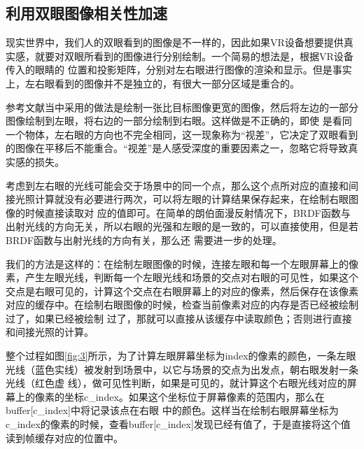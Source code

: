 \documentclass[UTF8]{ctexart}
\begin{document}
    \subsection{利用双眼图像相关性加速}
        现实世界中，我们人的双眼看到的图像是不一样的，因此如果VR设备想要提供真实感，就要对双眼所看到的图像进行分别绘制。一个简易的想法是，根据VR设备传入的眼睛的
        位置和投影矩阵，分别对左右眼进行图像的渲染和显示。但是事实上，左右眼看到的图像并不是独立的，有很大一部分区域是重合的。
        
        参考文献\cite{fujita2014foveated}当中采用的做法是绘制一张比目标图像更宽的图像，然后将左边的一部分图像绘制到左眼，将右边的一部分绘制到右眼。这样做是不正确的，即使
        是看同一个物体，左右眼的方向也不完全相同，这一现象称为“视差”，它决定了双眼看到的图像在平移后不能重合。“视差”是人感受深度的重要因素之一，忽略它将导致真实感的损失。
        
        考虑到左右眼的光线可能会交于场景中的同一个点，那么这个点所对应的直接和间接光照计算就没有必要进行两次，可以将左眼的计算结果保存起来，在绘制右眼图像的时候直接读取对
        应的值即可。在简单的朗伯面漫反射情况下，BRDF函数与出射光线的方向无关，所以右眼的光强和左眼的是一致的，可以直接使用，但是若BRDF函数与出射光线的方向有关，那么还
        需要进一步的处理。
        
        我们的方法是这样的：在绘制左眼图像的时候，连接左眼和每一个左眼屏幕上的像素，产生左眼光线，判断每一个左眼光线和场景的交点对右眼的可见性，如果这个
        交点是右眼可见的，计算这个交点在右眼屏幕上的对应的像素，然后保存在该像素对应的缓存中。在绘制右眼图像的时候，检查当前像素对应的内存是否已经被绘制过了，如果已经被绘制
        过了，那就可以直接从该缓存中读取颜色；否则进行直接和间接光照的计算。
        
        整个过程如图\ref{fig:3}所示，为了计算左眼屏幕坐标为index的像素的颜色，一条左眼光线（蓝色实线）被发射到场景中，以它与场景的交点为出发点，朝右眼发射一条光线（红色虚
        线），做可见性判断，如果是可见的，就计算这个右眼光线对应的屏幕上的像素的坐标c\_index。如果这个坐标位于屏幕像素的范围内，那么在buffer[c\_index]中将记录该点在右眼
        中的颜色。这样当在绘制右眼屏幕坐标为c\_index的像素的时候，查看buffer[c\_index]发现已经有值了，于是直接将这个值读到帧缓存对应的位置中。
        
\end{document}

